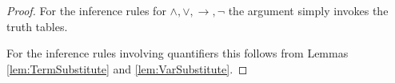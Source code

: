 \begin{proof}
For the inference rules for $\wedge, \vee, \to, \neg$ the argument simply invokes the truth tables.

For the inference rules involving quantifiers this follows from Lemmas \ref{lem:TermSubstitute} and \ref{lem:VarSubstitute}.
\end{proof}
